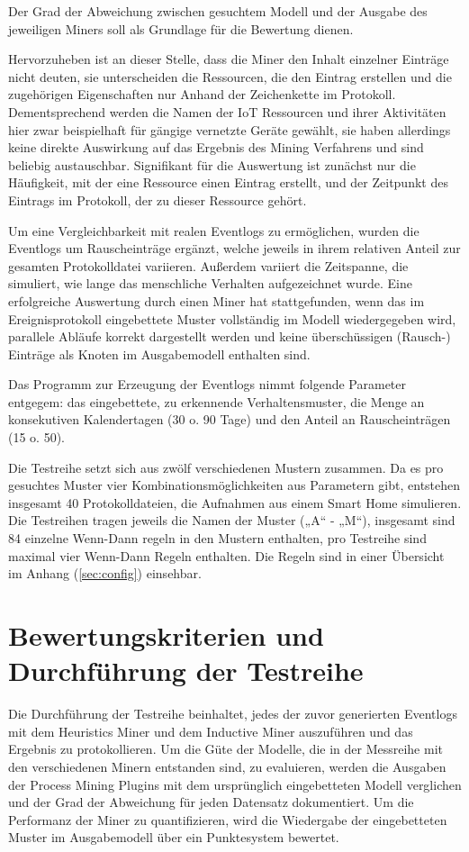 Der Grad der Abweichung zwischen gesuchtem Modell und der Ausgabe des jeweiligen Miners soll als Grundlage für die Bewertung dienen.

Hervorzuheben ist an dieser Stelle, dass die Miner den Inhalt einzelner Einträge nicht deuten, sie unterscheiden die Ressourcen, die den Eintrag erstellen und die zugehörigen Eigenschaften nur Anhand der Zeichenkette im Protokoll. Dementsprechend werden die Namen der IoT Ressourcen und ihrer Aktivitäten hier zwar beispielhaft für gängige vernetzte Geräte gewählt, sie haben allerdings keine direkte Auswirkung auf das Ergebnis des Mining Verfahrens und sind beliebig austauschbar. Signifikant für die Auswertung ist zunächst nur die Häufigkeit, mit der eine Ressource einen Eintrag erstellt, und der Zeitpunkt des Eintrags im Protokoll, der zu dieser Ressource gehört.

Um eine Vergleichbarkeit mit realen Eventlogs zu ermöglichen, wurden die Eventlogs um Rauscheinträge ergänzt, welche jeweils in ihrem relativen Anteil zur gesamten Protokolldatei variieren. Außerdem variiert die Zeitspanne, die simuliert, wie lange das menschliche Verhalten aufgezeichnet wurde. Eine erfolgreiche Auswertung durch einen Miner hat stattgefunden, wenn das im Ereignisprotokoll eingebettete Muster vollständig im Modell wiedergegeben wird, parallele Abläufe korrekt dargestellt werden und keine überschüssigen (Rausch-) Einträge als Knoten im Ausgabemodell enthalten sind.

Das Programm zur Erzeugung der Eventlogs nimmt folgende Parameter entgegem: das eingebettete, zu erkennende Verhaltensmuster, die Menge an konsekutiven Kalendertagen (30 o. 90 Tage) und den Anteil an Rauscheinträgen (15 o. 50). 

Die Testreihe setzt sich aus zwölf verschiedenen Mustern zusammen. Da es pro gesuchtes Muster vier Kombinationsmöglichkeiten aus Parametern gibt, entstehen insgesamt 40 Protokolldateien, die Aufnahmen aus einem Smart Home simulieren. Die Testreihen tragen jeweils die Namen der Muster („A“ - „M“), insgesamt sind 84 einzelne Wenn-Dann regeln in den Mustern enthalten, pro Testreihe sind maximal vier Wenn-Dann Regeln enthalten. Die Regeln sind in einer Übersicht im Anhang (\ref{sec:config}) einsehbar. 

\section{Bewertungskriterien und Durchführung der Testreihe}\label{sec:tests}
Die Durchführung der Testreihe beinhaltet, jedes der zuvor generierten Eventlogs mit dem Heuristics Miner und dem Inductive Miner auszuführen und das Ergebnis zu protokollieren. Um die Güte der Modelle, die in der Messreihe mit den verschiedenen Minern entstanden sind, zu evaluieren, werden die Ausgaben der Process Mining Plugins mit dem ursprünglich eingebetteten Modell verglichen und der Grad der Abweichung für jeden Datensatz dokumentiert. Um die Performanz der Miner zu quantifizieren, wird die Wiedergabe der eingebetteten Muster im Ausgabemodell über ein Punktesystem bewertet. 

